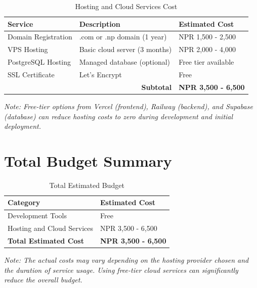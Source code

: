 \begin{table}[H]
    \centering
    \small
    \caption{Hosting and Cloud Services Cost}
    \begin{tabular}{p{4cm}p{5cm}p{3cm}}
        \toprule
        \textbf{Service} & \textbf{Description} & \textbf{Estimated Cost} \\
        \midrule
        Domain Registration & .com or .np domain (1 year) & NPR 1,500 - 2,500 \\
        VPS Hosting & Basic cloud server (3 months) & NPR 2,000 - 4,000 \\
        PostgreSQL Hosting & Managed database (optional) & Free tier available \\
        SSL Certificate & Let's Encrypt & Free \\
        \midrule
        \multicolumn{2}{r}{\textbf{Subtotal}} & \textbf{NPR 3,500 - 6,500} \\
        \bottomrule
    \end{tabular}
    \label{tab:hosting_services}
\end{table}

\textit{Note: Free-tier options from Vercel (frontend), Railway (backend), and Supabase (database) can reduce hosting costs to zero during development and initial deployment.}

\section{Total Budget Summary}

\begin{table}[H]
    \centering
    \small
    \caption{Total Estimated Budget}
    \begin{tabular}{p{6cm}p{4cm}}
        \toprule
        \textbf{Category} & \textbf{Estimated Cost} \\
        \midrule
        Development Tools & Free \\
        Hosting and Cloud Services & NPR 3,500 - 6,500 \\
        \midrule
        \textbf{Total Estimated Cost} & \textbf{NPR 3,500 - 6,500} \\
        \bottomrule
    \end{tabular}
    \label{tab:total_budget}
\end{table}

\textit{Note: The actual costs may vary depending on the hosting provider chosen and the duration of service usage. Using free-tier cloud services can significantly reduce the overall budget.}


